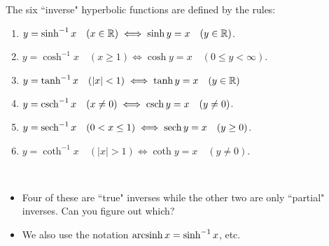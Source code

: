 \newpage

\begin{definition}
The six ``inverse" hyperbolic functions are defined by the rules:
\begin{enumerate}
\item $y=\sinh^{-1} x\quad (x\in\mathbb R) \iff \sinh y = x\quad (y\in\mathbb R)$.
\item $y = \cosh^{-1} x\quad (x\ge 1) \iff \cosh y = x\quad (0\le y<\infty)$.
\item $y = \tanh^{-1} x\quad (|x|<1) \iff \tanh y = x\quad (y\in\mathbb R)$ 
\item $y=\operatorname{csch}^{-1} x\quad (x\ne 0)\iff \operatorname{csch} y = x\quad (y\ne 0)$.
\item $y = \operatorname{sech}^{-1} x\quad (0<x\le 1) \iff \operatorname{sech} y = x\quad (y\ge 0)$.
\item $y = \coth^{-1} x\quad (|x|>1) \iff \coth y = x\quad (y\ne 0)$.
\end{enumerate}
\end{definition}
\begin{remark}\,
\begin{itemize}
\item Four of these are ``true" inverses while the other two are only ``partial" inverses.
Can you figure out which?
\item We also use the notation $\operatorname{arcsinh} x = \sinh^{-1} x$, etc.
\end{itemize}
\end{remark}

